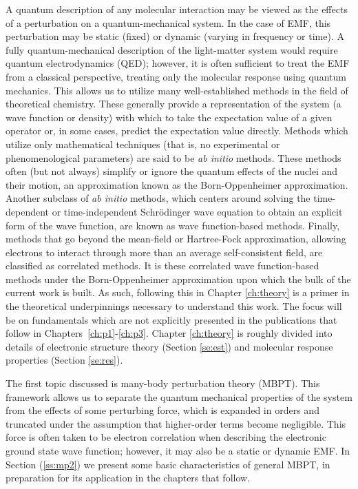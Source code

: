 A quantum description of any molecular interaction may be viewed as the
effects of a perturbation on a quantum-mechanical system. In the case of EMF,
this perturbation may be static (fixed) or dynamic (varying in frequency
or time). A fully quantum-mechanical description of the light-matter
system would require quantum electrodynamics (QED); however, it is often
sufficient to treat the EMF from a classical perspective, treating only the
molecular response using quantum mechanics.\cite{Barron2004,Helgaker2012}
This allows us to utilize many well-established methods in the field of
theoretical chemistry. These generally provide a representation of the
system (a wave function or density) with which to take the expectation
value of a given operator or, in some cases, predict the expectation value
directly.\cite{Szabo1996} Methods which utilize only mathematical techniques
(that is, no experimental or phenomenological parameters) are said to be
\textit{ab initio} methods. These methods often (but not always) simplify or
ignore the quantum effects of the nuclei and their motion, an approximation
known as the Born-Oppenheimer approximation.\cite{born1927zur} Another
subclass of \textit{ab initio} methods, which centers around solving the
time-dependent or time-independent Schr\"odinger wave equation to obtain
an explicit form of the wave function, are known as wave function-based
methods. Finally, methods that go beyond the mean-field or Hartree-Fock
approximation, allowing electrons to interact through more than an average
self-consistent field, are classified as correlated methods.  It is
these correlated wave function-based methods under the Born-Oppenheimer
approximation upon which the bulk of the current work is built. As such,
following this in Chapter \ref{ch:theory} is a primer in the theoretical
underpinnings necessary to understand this work.  The focus will be
on fundamentals which are not explicitly presented in the publications
that follow in Chapters~\ref{ch:p1}-\ref{ch:p3}. Chapter \ref{ch:theory}
is roughly divided into details of electronic structure theory (Section
\ref{se:est}) and molecular response properties (Section \ref{se:res}).

The first topic discussed is many-body perturbation theory
(MBPT).\cite{Bartlett2009} This framework allows us to separate the quantum
mechanical properties of the system from the effects of some perturbing
force, which is expanded in orders and truncated under the assumption
that higher-order terms become negligible.  This force is often taken to
be electron correlation when describing the electronic ground state wave
function;\cite{Moller1934} however, it may also be a static or dynamic
EMF. In Section (\ref{ss:mp2}) we present some basic characteristics of
general MBPT, in preparation for its application in the chapters that follow.

